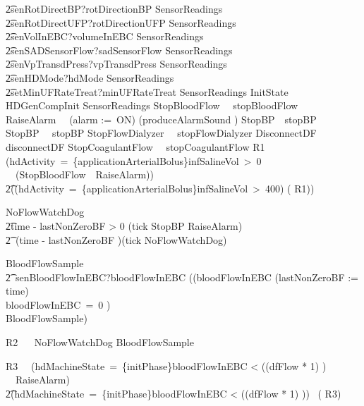\begin{circus}
    \t2\extchoice senRotDirectBP?rotDirectionBP \then SensorReadings\\
    \t2\extchoice senRotDirectUFP?rotDirectionUFP \then SensorReadings\\
    \t2\extchoice senVolInEBC?volumeInEBC \then SensorReadings\\
    \t2\extchoice senSADSensorFlow?sadSensorFlow \then SensorReadings\\
    \t2\extchoice senVpTransdPress?vpTransdPress \then SensorReadings\\
    \t2\extchoice senHDMode?hdMode \then SensorReadings\\
    \t2\extchoice setMinUFRateTreat?minUFRateTreat \then SensorReadings
  InitState ~\circdef~ HDGenCompInit \circseq SensorReadings
  StopBloodFlow~\circdef~
    stopBloodFlow \then \Skip
    \also RaiseAlarm~\circdef~ (alarm :=~ON) \circseq (produceAlarmSound \then \Skip)
    \also StopBP~\circdef~stopBP \then \Skip
    \also StopBP~\circdef~ stopBP \then \Skip
    \also StopFlowDialyzer~\circdef~ stopFlowDialyzer \then \Skip
    \also DisconnectDF~\circdef~ disconnectDF \then \Skip
    \also StopCoagulantFlow~\circdef~ stopCoagulantFlow \then \Skip
  R1~\circdef~
    (\lcircguard hdActivity~=~\{applicationArterialBolus\}\land infSalineVol~>~0 \rcircguard~\circguard~(StopBloodFlow~\interleave~RaiseAlarm))
    \t2\extchoice (\lcircguard \lnot (hdActivity~=~\{applicationArterialBolus\}\land infSalineVol~>~400) \rcircguard \circguard ( R1))

  NoFlowWatchDog ~\circdef~ \\
      \t2\lcircguard time - lastNonZeroBF > 0 \rcircguard \circguard (tick \then StopBP \circseq RaiseAlarm)
      \\\t2\extchoice~\lcircguard (time - lastNonZeroBF )\rcircguard \circguard (tick \then NoFlowWatchDog)

  BloodFlowSample  ~\circdef~  \\ %
      \t2~senBloodFlowInEBC?bloodFlowInEBC \then
      ((\circif bloodFlowInEBC 
                    \circthen (lastNonZeroBF := time)\\
                    \circelse bloodFlowInEBC~=~0 \circthen \Skip
                   \circfi) \circseq \\BloodFlowSample)

  R2 ~\circdef~ NoFlowWatchDog \interleave BloodFlowSample

  R3~\circdef~
    (\lcircguard hdMachineState~=~\{initPhase\}\land bloodFlowInEBC < ((dfFlow * 1) ) \rcircguard ~\circguard~RaiseAlarm)\\
    \t2\extchoice\lcircguard \lnot (hdMachineState~=~\{initPhase\}\land bloodFlowInEBC < ((dfFlow * 1) )) \rcircguard ~\circguard ( R3)


\end{circus}
